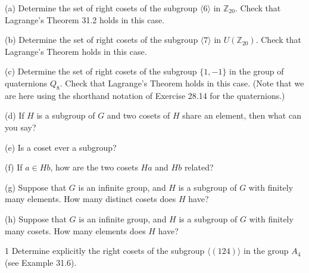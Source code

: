 \begin{problem}[Warmup]{(a)}
    Determine the set of right cosets of the subgroup $\langle 6 \rangle$ in $\mathbb{Z}_{20}$. Check that Lagrange's Theorem 31.2 holds in this case.
\end{problem}
\unsolved

\begin{problem}[Warmup]{(b)}
    Determine the set of right cosets of the subgroup $\langle 7 \rangle$ in $U(\mathbb{Z}_{20})$. Check that Lagrange's Theorem holds in this case.
\end{problem}
\unsolved

\begin{problem}[Warmup]{(c)}
    Determine the set of right cosets of the subgroup $\{1, -1\}$ in the group of quaternions $Q_8$. Check that Lagrange's Theorem holds in this case. (Note that we are here using the shorthand notation of Exercise 28.14 for the quaternions.)
\end{problem}
\unsolved

\begin{problem}[Warmup]{(d)}
    If $H$ is a subgroup of $G$ and two cosets of $H$ share an element, then what can you say?
\end{problem}
\unsolved

\begin{problem}[Warmup]{(e)}
    Is a coset ever a subgroup?
\end{problem}
\unsolved

\begin{problem}[Warmup]{(f)}
    If $a \in Hb$, how are the two cosets $Ha$ and $Hb$ related?
\end{problem}
\unsolved

\begin{problem}[Warmup]{(g)}
    Suppose that $G$ is an infinite group, and $H$ is a subgroup of $G$ with finitely many elements. How many distinct cosets does $H$ have?
\end{problem}
\unsolved

\begin{problem}[Warmup]{(h)}
    Suppose that $G$ is an infinite group, and $H$ is a subgroup of $G$ with finitely many cosets. How many elements does $H$ have?
\end{problem}
\unsolved

\begin{problem}{1}
    Determine explicitly the right cosets of the subgroup $\langle (124) \rangle$ in the
    group $A_4$ (see Example 31.6).
\end{problem}
\unsolved

